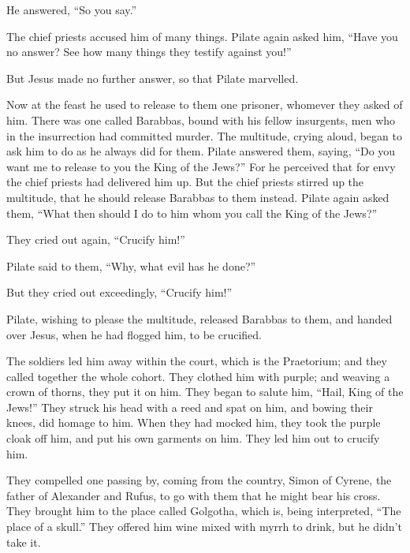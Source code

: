 He answered, ``So you say.''

 The chief priests accused him of many things.
 Pilate again asked him, ``Have you no answer? See how
many things they testify against you!''

 But Jesus made no further answer, so that Pilate
marvelled.

 Now at the feast he used to release to them one prisoner,
whomever they asked of him.  There was one called
Barabbas, bound with his fellow insurgents, men who in the insurrection
had committed murder.  The multitude, crying aloud, began
to ask him to do as he always did for them.  Pilate
answered them, saying, ``Do you want me to release to you the King of
the Jews?''  For he perceived that for envy the chief
priests had delivered him up.  But the chief priests
stirred up the multitude, that he should release Barabbas to them
instead.  Pilate again asked them, ``What then should I
do to him whom you call the King of the Jews?''

 They cried out again, ``Crucify him!''

 Pilate said to them, ``Why, what evil has he done?''

But they cried out exceedingly, ``Crucify him!''

 Pilate, wishing to please the multitude, released
Barabbas to them, and handed over Jesus, when he had flogged him, to be
crucified.

 The soldiers led him away within the court, which is the
Praetorium; and they called together the whole cohort. 
They clothed him with purple; and weaving a crown of thorns, they put it
on him.  They began to salute him, ``Hail, King of the
Jews!''  They struck his head with a reed and spat on
him, and bowing their knees, did homage to him.  When
they had mocked him, they took the purple cloak off him, and put his own
garments on him. They led him out to crucify him.

 They compelled one passing by, coming from the country,
Simon of Cyrene, the father of Alexander and Rufus, to go with them that
he might bear his cross.  They brought him to the place
called Golgotha, which is, being interpreted, ``The place of a skull.''
 They offered him wine mixed with myrrh to drink, but he
didn't take it.


